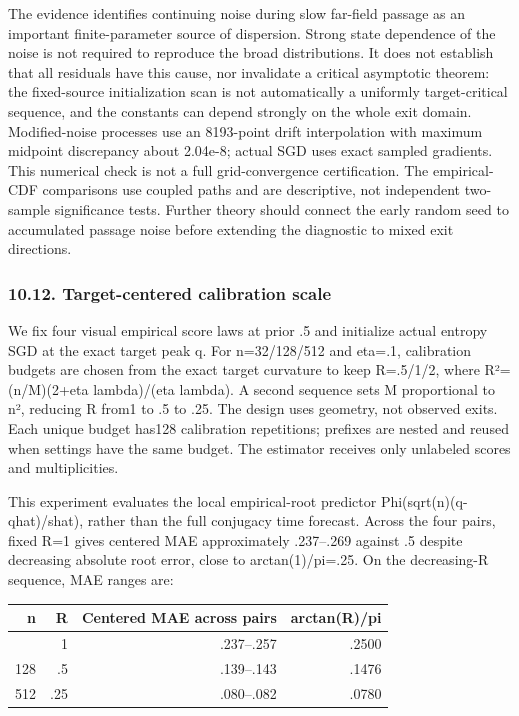 The evidence identifies continuing noise during slow far-field passage
as an important finite-parameter source of dispersion. Strong state
dependence of the noise is not required to reproduce the broad
distributions. It does not establish that all residuals have this cause,
nor invalidate a critical asymptotic theorem: the fixed-source
initialization scan is not automatically a uniformly target-critical
sequence, and the constants can depend strongly on the whole exit
domain. Modified-noise processes use an 8193-point drift interpolation
with maximum midpoint discrepancy about 2.04e-8; actual SGD uses exact
sampled gradients. This numerical check is not a full grid-convergence
certification. The empirical-CDF comparisons use coupled paths and are
descriptive, not independent two-sample significance tests. Further
theory should connect the early random seed to accumulated passage noise
before extending the diagnostic to mixed exit directions.

\subsubsection{10.12. Target-centered calibration
scale}\label{experiments-target-centered-calibration-scale}

We fix four visual empirical score laws at prior .5 and initialize
actual entropy SGD at the exact target peak q. For n=32/128/512 and
eta=.1, calibration budgets are chosen from the exact target curvature
to keep R=.5/1/2, where R²=(n/M)(2+eta lambda)/(eta lambda). A second
sequence sets M proportional to n², reducing R from1 to .5 to .25. The
design uses geometry, not observed exits. Each unique budget has128
calibration repetitions; prefixes are nested and reused when settings
have the same budget. The estimator receives only unlabeled scores and
multiplicities.

This experiment evaluates the local empirical-root predictor
Phi(sqrt(n)(q-qhat)/shat), rather than the full conjugacy time forecast.
Across the four pairs, fixed R=1 gives centered MAE approximately
.237--.269 against .5 despite decreasing absolute root error, close to
arctan(1)/pi=.25. On the decreasing-R sequence, MAE ranges are:

{\def\LTcaptype{table} %
\begin{longtable}[]{@{}rrrr@{}}
\toprule\noalign{}
n & R & Centered MAE across pairs & arctan(R)/pi \\
\midrule\noalign{}
\endhead
\bottomrule\noalign{}
\endlastfoot
32 & 1 & .237--.257 & .2500 \\
128 & .5 & .139--.143 & .1476 \\
512 & .25 & .080--.082 & .0780 \\
\end{longtable}
}


